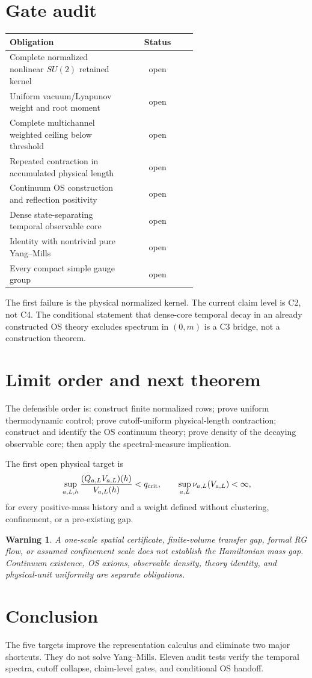 \documentclass[11pt]{article}
\newtheorem{warning}{Warning}
\begin{document}
\section{Gate audit}
\begin{center}
\begin{tabular}{p{0.62\linewidth}c}
\toprule
Obligation & Status\\
\midrule
Complete normalized nonlinear $SU(2)$ retained kernel & open\\
Uniform vacuum/Lyapunov weight and root moment & open\\
Complete multichannel weighted ceiling below threshold & open\\
Repeated contraction in accumulated physical length & open\\
Continuum OS construction and reflection positivity & open\\
Dense state-separating temporal observable core & open\\
Identity with nontrivial pure Yang--Mills & open\\
Every compact simple gauge group & open\\
\bottomrule
\end{tabular}
\end{center}
The first failure is the physical normalized kernel.  The current claim level
is C2, not C4.  The conditional statement that dense-core temporal decay in an
already constructed OS theory excludes spectrum in $(0,m)$ is a C3 bridge,
not a construction theorem.

\section{Limit order and next theorem}
The defensible order is: construct finite normalized rows; prove uniform
thermodynamic control; prove cutoff-uniform physical-length contraction;
construct and identify the OS continuum theory; prove density of the decaying
observable core; then apply the spectral-measure implication.

The first open physical target is
\[
 \sup_{a,L,h}\frac{(Q_{a,L}V_{a,L})(h)}{V_{a,L}(h)}<q_{\rm crit},
 \qquad
 \sup_{a,L}\nu_{a,L}(V_{a,L})<\infty,
\]
for every positive-mass history and a weight defined without clustering,
confinement, or a pre-existing gap.

\begin{warning}
A one-scale spatial certificate, finite-volume transfer gap, formal RG flow,
or assumed confinement scale does not establish the Hamiltonian mass
gap.  Continuum existence, OS axioms, observable density, theory identity, and
physical-unit uniformity are separate obligations.
\end{warning}

\section{Conclusion}
The five targets improve the representation calculus and eliminate two major
shortcuts.  They do not solve Yang--Mills.  Eleven audit tests verify the
temporal spectra, cutoff collapse, claim-level gates, and conditional OS
handoff.
\end{document}
